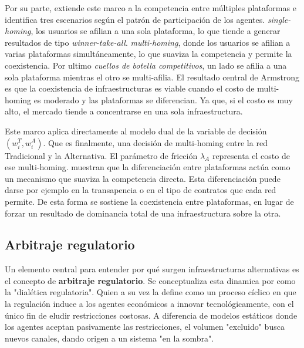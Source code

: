 Por su parte,  extiende este marco a la competencia entre
múltiples plataformas e identifica tres escenarios según el patrón de
participación de los agentes. \textit{single-homing}, los usuarios se afilian a
una sola plataforma, lo que tiende a generar resultados de tipo
\textit{winner-take-all}. \textit{multi-homing}, donde los usuarios se afilian a varias plataformas simultáneamente, lo que suaviza la competencia y permite la coexistencia. Por ultimo \textit{cuellos de botella
competitivos}, un lado se afilia a una sola plataforma mientras el otro se
multi-afilia. El resultado central de Armstrong es que la coexistencia de
infraestructuras es viable cuando el costo de multi-homing es moderado y las
plataformas se diferencian. Ya que, si el costo es muy alto, el mercado tiende a concentrarse en una sola infraestructura.

Este marco aplica directamente al modelo dual de 
la variable de decisión $(w_i^T, w_i^A)$. Que es finalmente, una decisión de
multi-homing entre la red Tradicional y la Alternativa. El parámetro de
fricción $\lambda_A$ representa el costo de ese multi-homing.  muestran que la diferenciación entre plataformas actúa como un mecanismo que suaviza la competencia directa. Esta diferenciación puede darse por ejemplo en la transapencia o en el tipo de contratos que cada red permite. De esta forma se sostiene la coexistencia entre plataformas, en lugar de forzar un resultado de dominancia total de una infraestructura sobre la otra.

\subsection{Arbitraje regulatorio}

Un elemento central para entender por qué surgen infraestructuras alternativas es el concepto de \textbf{arbitraje regulatorio}. Se conceptualiza esta dinamica por  como la "dialética regulatoria". Quien a su vez la define como un proceso cíclico en que la regulación induce a los agentes económicos a innovar tecnológicamente, con el único fin de eludir restricciones costosas. A diferencia de modelos estáticos donde los agentes aceptan pasivamente las restricciones, el volumen "excluido" busca nuevos canales, dando origen a un sistema "en la sombra".

